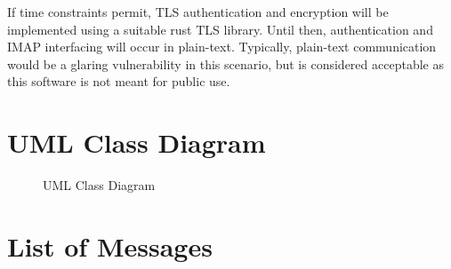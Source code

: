 \documentclass[a4paper,12pt]{article}
\begin{document}
If time constraints permit, TLS authentication and encryption will be implemented using a suitable rust TLS library.
Until then, authentication and IMAP interfacing will occur in plain-text.
Typically, plain-text communication would be a glaring vulnerability in this scenario, but is considered acceptable as this software is not meant for public use.

\section*{UML Class Diagram}

\begin{figure}[H]
    \centering
    
    \caption{UML Class Diagram}
\end{figure}

\section*{List of Messages}
\end{document}
